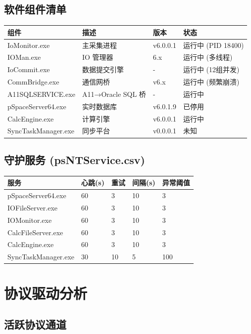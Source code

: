 \documentclass[12pt,a4paper]{ctexart}
\begin{document}
\subsection{软件组件清单}

\begin{longtable}{p{3cm}p{5cm}p{2.5cm}p{3cm}}
\toprule
\textbf{组件} & \textbf{描述} & \textbf{版本} & \textbf{状态} \\
\midrule
IoMonitor.exe & 主采集进程 & v6.0.0.1 & 运行中 (PID 18400) \\
IOMan.exe & IO 管理器 & 6.x & 运行中 (多线程) \\
IoCommit.exe & 数据提交引擎 & - & 运行中 (12组并发) \\
CommBridge.exe & 通信网桥 & v6.x & 运行中 (频繁崩溃) \\
A11SQLSERVICE.exe & A11→Oracle SQL 桥 & - & 运行中 \\
pSpaceServer64.exe & 实时数据库 & v6.0.1.9 & 已停用 \\
CalcEngine.exe & 计算引擎 & v6.0.0.1 & 运行中 \\
SyncTaskManager.exe & 同步平台 & v0.0.0.1 & 未知 \\
\bottomrule
\end{longtable}

\subsection{守护服务 (psNTService.csv)}

\begin{longtable}{p{5cm}p{2cm}p{2cm}p{2cm}p{2cm}}
\toprule
\textbf{服务} & \textbf{心跳(s)} & \textbf{重试} & \textbf{间隔(s)} & \textbf{异常阈值} \\
\midrule
pSpaceServer64.exe & 60 & 3 & 10 & 3 \\
IOFileServer.exe & 60 & 3 & 10 & 3 \\
IOMonitor.exe & 60 & 3 & 10 & 3 \\
CalcFileServer.exe & 60 & 3 & 10 & 3 \\
CalcEngine.exe & 60 & 3 & 10 & 3 \\
SyncTaskManager.exe & 30 & 10 & 5 & 100 \\
\bottomrule
\end{longtable}

\section{协议驱动分析}

\subsection{活跃协议通道}
\end{document}
